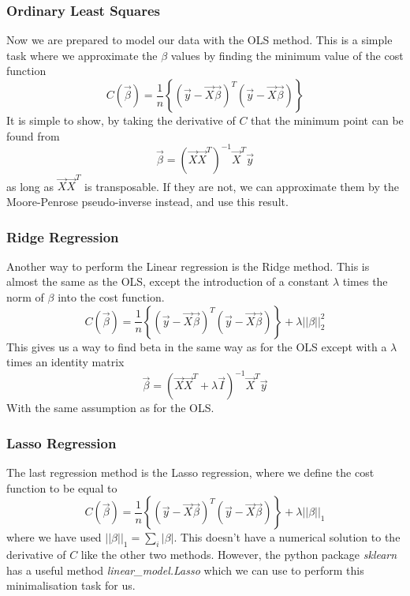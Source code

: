 \documentclass[11pt, A4paper, english]{article}
\begin{document}
\begin{multicols}{2}
				\subsubsection{Ordinary Least Squares}
Now we are prepared to model our data with the OLS method. This is a simple task where we approximate the $\beta$ values by finding the minimum value of the cost function
				\begin{equation*}
C(\vec{\beta}) =  \frac{1}{n} \left\{ \left( \vec{y} - \vec{X} \vec{\beta} \right)^{T} \left( \vec{y} - \vec{X} \vec{\beta} \right) \right\}
				\end{equation*}
It is simple to show, by taking the derivative of $C$ that the minimum point can be found from
				\begin{equation}
\vec{\beta} = \left( \vec{X} \vec{X}^T \right)^{-1} \vec{X}^T \vec{y}
				\end{equation}
as long as $\vec{X} \vec{X}^T$ is transposable. If they are not, we can approximate them by the Moore-Penrose pseudo-inverse instead, and use this result.

			\subsubsection{Ridge Regression}
Another way to perform the Linear regression is the Ridge method. This is almost the same as the OLS, except the introduction of a constant $\lambda$ times the norm of $\beta$ into the cost function.
				\begin{equation*}
C(\vec{\beta}) =  \frac{1}{n} \left\{ \left( \vec{y} - \vec{X} \vec{\beta} \right)^{T} \left( \vec{y} - \vec{X} \vec{\beta} \right) \right\} + \lambda ||\beta||_2^2
				\end{equation*}
This gives us a way to find beta in the same way as for the OLS except with a $\lambda$ times an identity matrix
				\begin{equation}
\vec{\beta} = \left( \vec{X} \vec{X}^T + \lambda \vec{I} \right)^{-1} \vec{X}^T \vec{y}
				\end{equation}
With the same assumption as for the OLS.

			\subsubsection{Lasso Regression}
The last regression method is the Lasso regression, where we define the cost function to be equal to
				\begin{equation*}
C(\vec{\beta}) =  \frac{1}{n} \left\{ \left( \vec{y} - \vec{X} \vec{\beta} \right)^{T} \left( \vec{y} - \vec{X} \vec{\beta} \right) \right\} + \lambda ||\beta||_1
				\end{equation*}
where we have used $||\beta||_1 = \sum_{i} |\beta|$. This doesn't have a numerical solution to the derivative of $C$ like the other two methods. However, the python package \textit{sklearn} has a useful method \textit{linear\_model.Lasso} which we can use to perform this minimalisation task for us. \\


\end{multicols}
\end{document}
